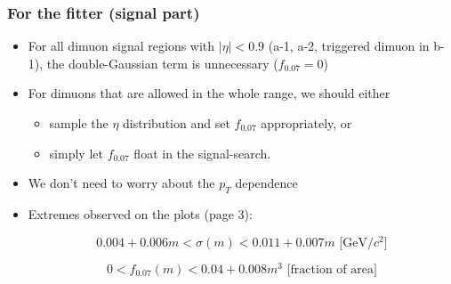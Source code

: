 \documentclass[compress]{beamer}
\begin{document}
\begin{frame}
\frametitle{For the fitter (signal part)}
\begin{itemize}
\item For all dimuon signal regions with $|\eta| < 0.9$ (a-1, a-2,
  triggered dimuon in b-1), the double-Gaussian term is unnecessary
  ($f_{0.07} = 0$)
\item For dimuons that are allowed in the whole range, we should either
\begin{itemize}
\item sample the $\eta$ distribution and set $f_{0.07}$ appropriately, or
\item simply let $f_{0.07}$ float in the signal-search.
\end{itemize}

\item We don't need to worry about the $p_T$ dependence

\item Extremes observed on the plots (page 3):

\begin{equation}
0.004 + 0.006 m < \sigma(m) < 0.011 + 0.007 m \mbox{ [GeV/$c^2$]}
\end{equation}

\begin{equation}
0 < f_{0.07}(m) < 0.04 + 0.008 m^3 \mbox{ [fraction of area]}
\end{equation}
\end{itemize}
\end{frame}
\end{document}
